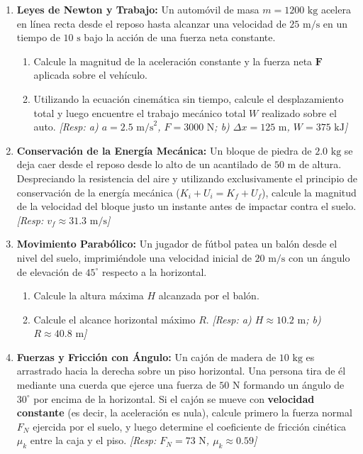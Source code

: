 \documentclass[11pt,a4paper]{book}
\begin{document}
\begin{enumerate}
    \item \textbf{Leyes de Newton y Trabajo:} Un automóvil de masa $m = 1200 \text{ kg}$ acelera en línea recta desde el reposo hasta alcanzar una velocidad de $25 \text{ m/s}$ en un tiempo de $10 \text{ s}$ bajo la acción de una fuerza neta constante. 
    \begin{enumerate}
        \item Calcule la magnitud de la aceleración constante y la fuerza neta $\boldsymbol{F}$ aplicada sobre el vehículo.
        \item Utilizando la ecuación cinemática sin tiempo, calcule el desplazamiento total y luego encuentre el trabajo mecánico total $W$ realizado sobre el auto. \textit{[Resp: a) $a = 2.5 \text{ m/s}^2$, $F = 3000 \text{ N}$; b) $\Delta x = 125 \text{ m}$, $W = 375 \text{ kJ}$]}
    \end{enumerate}

    \item \textbf{Conservación de la Energía Mecánica:} Un bloque de piedra de $2.0 \text{ kg}$ se deja caer desde el reposo desde lo alto de un acantilado de $50 \text{ m}$ de altura. Despreciando la resistencia del aire y utilizando exclusivamente el principio de conservación de la energía mecánica ($K_i + U_i = K_f + U_f$), calcule la magnitud de la velocidad del bloque justo un instante antes de impactar contra el suelo. \textit{[Resp: $v_f \approx 31.3 \text{ m/s}$]}

    \item \textbf{Movimiento Parabólico:} Un jugador de fútbol patea un balón desde el nivel del suelo, imprimiéndole una velocidad inicial de $20 \text{ m/s}$ con un ángulo de elevación de $45^\circ$ respecto a la horizontal. 
    \begin{enumerate}
        \item Calcule la altura máxima $H$ alcanzada por el balón.
        \item Calcule el alcance horizontal máximo $R$. \textit{[Resp: a) $H \approx 10.2 \text{ m}$; b) $R \approx 40.8 \text{ m}$]}
    \end{enumerate}

    \item \textbf{Fuerzas y Fricción con Ángulo:} Un cajón de madera de $10 \text{ kg}$ es arrastrado hacia la derecha sobre un piso horizontal. Una persona tira de él mediante una cuerda que ejerce una fuerza de $50 \text{ N}$ formando un ángulo de $30^\circ$ por encima de la horizontal. Si el cajón se mueve con \textbf{velocidad constante} (es decir, la aceleración es nula), calcule primero la fuerza normal $F_N$ ejercida por el suelo, y luego determine el coeficiente de fricción cinética $\mu_k$ entre la caja y el piso. \textit{[Resp: $F_N = 73 \text{ N}$, $\mu_k \approx 0.59$]}


\end{enumerate}
\end{document}
